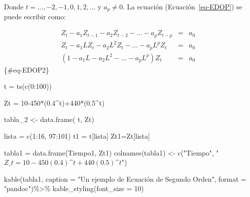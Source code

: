 \documentclass[
  a4paper,
]{article}
\newenvironment{Shaded}{}{}
\newcommand{\AttributeTok}[1]{\textcolor[rgb]{0.84,0.23,0.29}{#1}}
\newcommand{\DecValTok}[1]{\textcolor[rgb]{0.00,0.36,0.77}{#1}}
\newcommand{\FloatTok}[1]{\textcolor[rgb]{0.00,0.36,0.77}{#1}}
\newcommand{\FunctionTok}[1]{\textcolor[rgb]{0.44,0.26,0.76}{#1}}
\newcommand{\NormalTok}[1]{\textcolor[rgb]{0.14,0.16,0.18}{#1}}
\newcommand{\OtherTok}[1]{\textcolor[rgb]{0.44,0.26,0.76}{#1}}
\newcommand{\SpecialCharTok}[1]{\textcolor[rgb]{0.00,0.36,0.77}{#1}}
\newcommand{\StringTok}[1]{\textcolor[rgb]{0.01,0.18,0.38}{#1}}
\begin{document}
Donde \(t = \ldots, -2, -1, 0, 1, 2, \ldots\) y \(a_p \neq 0\). La
ecuación (Ecuación~\ref{eq-EDOP}) se puede escribir como:

\begin{eqnarray}
    Z_t - a_1 Z_{t-1} - a_2 Z_{t-2} - \ldots - a_p Z_{t-p} & = & a_0 \nonumber \\
    Z_t - a_1 L Z_t - a_2 L^2 Z_t - \ldots - a_p L^p Z_t & = & a_0 \nonumber \\
    (1 - a_1 L - a_2 L^2 - \ldots - a_p L^p) Z_t & = & a_0
\end{eqnarray} \{\#eq-EDOP2\}

\begin{Shaded}
\begin{Highlighting}[]
\NormalTok{t }\OtherTok{=} \FunctionTok{ts}\NormalTok{(}\FunctionTok{c}\NormalTok{(}\DecValTok{0}\SpecialCharTok{:}\DecValTok{100}\NormalTok{))}

\NormalTok{Zt }\OtherTok{=} \DecValTok{10{-}450}\SpecialCharTok{*}\NormalTok{(}\FloatTok{0.4}\SpecialCharTok{\^{}}\NormalTok{t)}\SpecialCharTok{+}\DecValTok{440}\SpecialCharTok{*}\NormalTok{(}\FloatTok{0.5}\SpecialCharTok{\^{}}\NormalTok{t)}

\NormalTok{tabla\_2 }\OtherTok{\textless{}{-}} \FunctionTok{data.frame}\NormalTok{( t, Zt) }

\NormalTok{lista }\OtherTok{=} \FunctionTok{c}\NormalTok{(}\DecValTok{1}\SpecialCharTok{:}\DecValTok{16}\NormalTok{, }\DecValTok{97}\SpecialCharTok{:}\DecValTok{101}\NormalTok{)}
\NormalTok{t1 }\OtherTok{=}\NormalTok{ t[lista]}
\NormalTok{Zt1}\OtherTok{=}\NormalTok{Zt[lista]}


\NormalTok{tabla1 }\OtherTok{=} \FunctionTok{data.frame}\NormalTok{(Tiempo1, Zt1)}
\FunctionTok{colnames}\NormalTok{(tabla1) }\OtherTok{\textless{}{-}} \FunctionTok{c}\NormalTok{(}\StringTok{"Tiempo"}\NormalTok{, }\StringTok{"$Z\_t =10{-}450(0.4)\^{}t+440(0.5)\^{}t$"}\NormalTok{)}

\FunctionTok{kable}\NormalTok{(tabla1, }
      \AttributeTok{caption =} \StringTok{"Un ejemplo de Ecuación de Segundo Orden"}\NormalTok{, }
      \AttributeTok{format =} \StringTok{"pandoc"}\NormalTok{)}\SpecialCharTok{\%\textgreater{}\%}
  \FunctionTok{kable\_styling}\NormalTok{(}\AttributeTok{font\_size =} \DecValTok{10}\NormalTok{)}
\end{Highlighting}
\end{Shaded}
\end{document}
